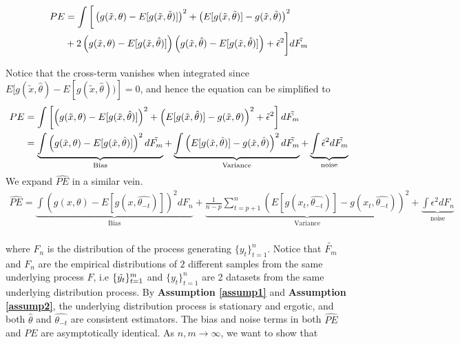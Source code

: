 \documentclass[12pt, oneside]{amsart}
\theoremstyle{definition}
\theoremstyle{remark}
\numberwithin{equation}{section}
\begin{document}
\begin{align*}
    PE &= \int \bigg[ \left(g(\tilde{x},\theta) - E[g(\tilde{x},\tilde{\theta})]\right)^2 + \left(E[g(\tilde{x},\tilde{\theta})] - g(\tilde{x}, \tilde{\theta})\right)^2 \\
    &+ 2 \left( g(\tilde{x}, \theta) - E[g(\tilde{x}, \hat{\theta})]\right) \left( g(\tilde{x},\hat{\theta}) - E[g(\tilde{x}, \hat{\theta})] \right) + \tilde{\epsilon}^2 \bigg] d\Tilde{F_m} 
\end{align*}

Notice that the cross-term vanishes when integrated since $E[ g(\tilde{x},\hat{\theta}) - E[g(\tilde{x},\hat{\theta}))] = 0$, and hence the equation can be simplified to
\begin{align*}
PE  &= \int \left[ \left(g(\Tilde{x}, \theta) - E[g(\Tilde{x}, \hat{\theta})] \right)^2 + \left(E[g(\Tilde{x}, \hat{\theta})] - g(\Tilde{x},\theta)\right)^2 + \Tilde{\epsilon}^2 \right] d\Tilde{F_m}\\ 
    &= \underbrace{\int  \left(g(\Tilde{x}, \theta) - E[g(\Tilde{x}, \hat{\theta})] \right)^2 d\Tilde{F_m}}_\text{Bias} + \underbrace{\int \left(E[g(\Tilde{x}, \hat{\theta})] - g(\Tilde{x},\hat{\theta})\right)^2 d\Tilde{F_m}}_\text{Variance} + \underbrace{\int \Tilde{\epsilon}^2  d\Tilde{F_m}}_\text{noise}\\  
\end{align*}
We expand $\hat{PE}$ in a similar vein. 
\begin{align*}
     \hat{PE} = \underbrace{\int  \left(g(x, \theta) - E[g(x, \hat{\theta_{-t}})] \right)^2 dF_n}_\text{Bias} + \underbrace{ \frac{1}{n-p}\sum_{t=p+1}^n \left( E[g(x_t, \hat{\theta_{-t}})] - g(x_t, \hat{\theta_{-t}}) \right)^2     }_\text{Variance} + \underbrace{\int \epsilon^2dF_n}_\text{noise}\\  
\end{align*}

where $F_n$ is the distribution of the process generating $\{y_t\}^n_{t=1}$. Notice that $\tilde{F_m}$ and $F_n$ are the empirical distributions of $2$ different samples from the same underlying process $F$, i.e $\{\Tilde{y_t}\}_{t=1}^m$ and $\{y_t\}_{t=1}^n$ are 2 datasets from the same underlying distribution process. By \textbf{Assumption \ref{assump1}} and \textbf{Assumption \ref{assump2}}, the underlying distribution process is stationary and ergotic, and  both $\hat{\theta}$ and $\hat{\theta_{-t}}$ are consistent estimators. The bias and noise terms in both $\hat{PE}$ and $PE$ are asymptotically identical. As $n, m \rightarrow \infty $, we want to show that
\end{document}
